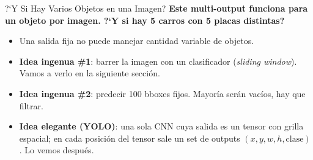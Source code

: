 \documentclass[aspectratio=169, 11pt]{beamer}
\begin{document}
\begin{frame}[shrink]{?`Y Si Hay Varios Objetos en una Imagen?}
  \vspace{8pt}
  {\footnotesize\color{arcaDark}\bfseries
    Este multi-output funciona para \textbf{un objeto} por imagen.
    ?`Y si hay 5 carros con 5 placas distintas?}

  \vspace{14pt}
  {\footnotesize
  \begin{itemize}\setlength{\itemsep}{6pt}
    \item[{\color{arcaRed}\scriptsize\faArrowRight}]
      Una salida fija no puede manejar cantidad variable de objetos.
    \item[{\color{arcaRed}\scriptsize\faArrowRight}]
      \textbf{Idea ingenua \#1}: barrer la imagen con un clasificador
      (\emph{sliding window}). Vamos a verlo en la siguiente secci\'on.
    \item[{\color{arcaRed}\scriptsize\faArrowRight}]
      \textbf{Idea ingenua \#2}: predecir 100 bboxes fijos. Mayor\'ia ser\'an
      vac\'ios, hay que filtrar.
    \item[{\color{codeGreen}\scriptsize\faArrowRight}]
      \textbf{Idea elegante (YOLO)}: una sola CNN cuya salida es un
      tensor con grilla espacial; en cada posici\'on del tensor sale
      un set de outputs $(x,y,w,h,\text{clase})$. Lo vemos despu\'es.
  \end{itemize}
  }
\end{frame}
\end{document}
